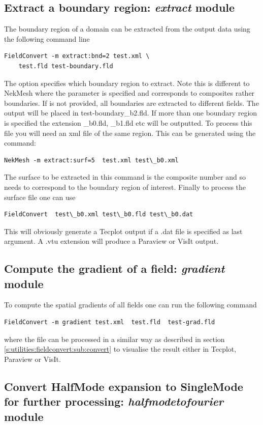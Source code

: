 \subsection{Extract a boundary region: \textit{extract} module}
The boundary region of a domain can be extracted from the output
data using the following command line
%
\begin{lstlisting}[style=BashInputStyle]
FieldConvert -m extract:bnd=2 test.xml \
	test.fld test-boundary.fld
\end{lstlisting}
%
The option  specifies which boundary region to extract.
Note this is different to NekMesh where the parameter \inltt{surf}
is specified and corresponds to composites rather boundaries. If 
is not provided, all boundaries are extracted to different fields.
The output will be placed in test-boundary\_b2.fld.
If more than one boundary region is specified the extension \_b0.fld, \_b1.fld etc will be
outputted. To process this file you will need an xml file of the same region.
This can be generated using the command:
%
\begin{lstlisting}[style=BashInputStyle]
NekMesh -m extract:surf=5  test.xml test\_b0.xml
\end{lstlisting}
%
The surface to be extracted in this command is the composite
number and so needs to correspond to the boundary region
of interest. Finally to process the surface file one can use
%
\begin{lstlisting}[style=BashInputStyle]
FieldConvert  test\_b0.xml test\_b0.fld test\_b0.dat
\end{lstlisting}
%
This will obviously generate a Tecplot output if a .dat file
is specified as last argument. A .vtu extension will produce
a Paraview or VisIt output.
%
%
%
\subsection{Compute the gradient of a field: \textit{gradient} module}
To compute the spatial gradients of all fields one can run the following command
%
\begin{lstlisting}[style=BashInputStyle]
FieldConvert -m gradient test.xml  test.fld  test-grad.fld
\end{lstlisting}
%
where the file  can be processed in a similar
way as described in section \ref{s:utilities:fieldconvert:sub:convert}
to visualise the result either in Tecplot, Paraview or VisIt.
%
%

\subsection{Convert HalfMode expansion to SingleMode for further processing: \textit{halfmodetofourier} module}

